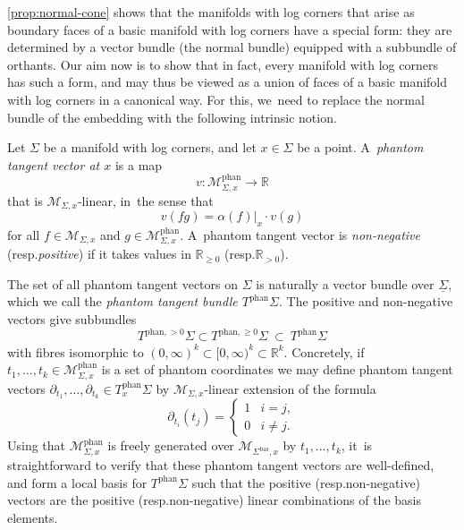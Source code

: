 \documentclass[10pt]{amsart}
\theoremstyle{definition}
\theoremstyle{remark}
\let\defn\emph
\newcommand{\RR}{\mathbb{R}}
\newcommand{\halfspc}[1]{[0,\infty)^{#1}}
\renewcommand{\ge}{\geqslant}
\newcommand{\cM}{\mathscr{M}}
\newcommand{\cMphan}{\mathscr{M}^{\mathrm{phan}}}
\newcommand{\cvf}[1]{\partial_{#1}}
\newcommand{\Sig}{\Sigma}
\newcommand{\uSig}{\underline{\Sigma}}
\newcommand{\bas}[1]{{#1}^{\mathrm{bas}}}
\newcommand{\phant}{\mathrm{phan}}
\newcommand{\Sigbas}{\bas{\Sig}}
\newcommand{\tbphan}[2][]{T_{#1}^{\phant}#2}
\newcommand{\tbposphan}[2][]{T^{\phant,>0}_{#1}#2}
\newcommand{\tbgephan}[2][]{T^{\phant,\ge0}_{#1}#2}
\providecommand{\resp}{resp.}\providecommand{\cf}{cf.}\providecommand{\etc}{etc.}
\begin{document}
\autoref{prop:normal-cone} shows that the manifolds with log corners that arise as boundary faces of a basic manifold with log corners have a special form: they are determined by a vector bundle (the normal bundle) equipped with a subbundle of orthants. Our aim now is to show that in fact, every manifold with log corners has such a form, and may thus be viewed as a union of faces of a basic manifold with log corners in a canonical way. For this, we~need to replace the normal bundle of the embedding with the following intrinsic notion.
\begin{definition}
Let $\Sig$ be a manifold with log corners, and let $x \in \Sig$ be a point. A~\defn{phantom tangent vector at $x$} is a map
\[
v \colon \cMphan_{\Sig,x} \to \RR
\]
that is $\cM_{\Sig,x}$-linear, in~the sense that
\[
v(fg) = \alpha(f)|_x \cdot v(g)
\]
for all $f \in \cM_{\Sig,x}$ and $g \in \cMphan_{\Sig,x}$. A~phantom tangent vector is \defn{non-negative} (\resp \defn{positive}) if it takes values in $\RR_{\ge0}$ (\resp $\RR_{>0}$).
\end{definition}

The set of all phantom tangent vectors on $\Sig$ is naturally a vector bundle over $\uSig$, which we call the \defn{phantom tangent bundle $\tbphan{\Sig}$}. The positive and non-negative vectors give subbundles
\[
\tbposphan{\Sig}\subset \tbgephan{\Sig} \ \subset\ \tbphan{\Sig}
\]
with fibres isomorphic to $(0,\infty)^k \subset \halfspc{k}\subset \RR^k$. Concretely, if $t_1,\ldots,t_k \in \cMphan_{\Sig,x}$ is a set of phantom coordinates we may define phantom tangent vectors $\cvf{t_1},\ldots,\cvf{t_k} \in \tbphan[x]{\Sig}$ by $\cM_{\Sig,x}$-linear extension of the formula
\[
\cvf{t_i}(t_j) = \begin{cases}
1 & i=j, \\
0 & i \neq j.
\end{cases}
\]
Using that $\cMphan_{\Sig,x}$ is freely generated over $\cM_{\Sigbas,x}$ by $t_1,\ldots,t_k$, it~is straightforward to verify that these phantom tangent vectors are well-defined, and form a local basis for $\tbphan{\Sig}$ such that the positive (\resp non-negative) vectors are the positive (\resp non-negative) linear combinations of the basis elements.
\end{document}
